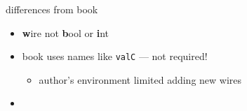 \begin{frame}{differences from book}
    \begin{itemize}
    \item {\textbf wire} not {\textbf bool} or {\textbf int}
    \item book uses names like {\tt valC} --- not required!
        \begin{itemize}
        \item author's environment limited adding new wires
        \end{itemize}
    \item {}
    \end{itemize}
\end{frame}

